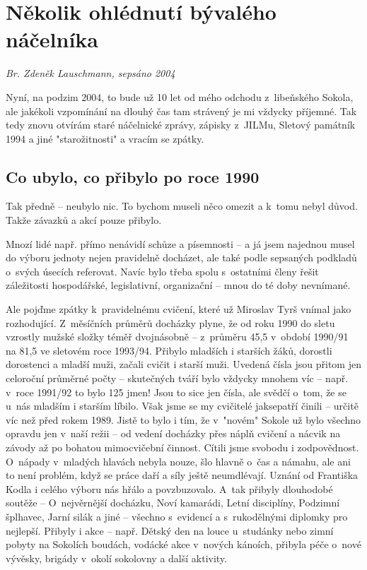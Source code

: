 \documentclass[a5paper, 11pt, twoside]{article}
\begin{document}
\section{Několik ohlédnutí bývalého
náčelníka}

\textit{Br. Zdeněk Lauschmann, sepsáno 2004}

Nyní, na podzim 2004, to bude už 10 let od mého odchodu z~libeňského
Sokola, ale jakékoli vzpomínání na dlouhý čas tam strávený je mi vždycky
příjemné. Tak tedy znovu otvírám staré náčelnické zprávy, zápisky
z~JILMu, Sletový památník 1994 a jiné "starožitnosti" a vracím se zpátky.

\subsection{Co ubylo, co přibylo po roce
1990}

Tak předně -- neubylo nic. To bychom museli něco omezit a k~tomu nebyl
důvod. Takže závazků a akcí pouze přibylo.

Mnozí lidé např. přímo nenávidí schůze a písemnosti -- a já jsem
najednou musel do výboru jednoty nejen pravidelně docházet, ale také
podle sepsaných podkladů o~svých úsecích referovat. Navíc bylo třeba
spolu s~ostatními členy řešit záležitosti hospodářské, legislativní,
organizační -- mnou do té doby nevnímané.

Ale pojďme zpátky k~pravidelnému cvičení, které už Miroslav Tyrš vnímal
jako rozhodující. Z~měsíčních průměrů docházky plyne, že od roku 1990 do
sletu vzrostly mužské složky téměř dvojnásobně -- z~průměru 45,5
v~období 1990/91 na 81,5 ve sletovém roce 1993/94. Přibylo mladších i
starších žáků, dorostli dorostenci a mladší muži, začali cvičit i starší
muži. Uvedená čísla jsou přitom jen celoroční průměrné počty --
skutečných tváří bylo vždycky mnohem víc -- např. v~roce 1991/92 to bylo
125 jmen! Jsou to sice jen čísla, ale svědčí o~tom, že se u~nás mladším
i starším líbilo. Však jsme se my cvičitelé jaksepatří činili -- určitě
víc než před rokem 1989. Jistě to bylo i tím, že v~"novém" Sokole už
bylo všechno opravdu jen v~naší režii -- od vedení docházky přes náplň
cvičení a nácvik na závody až po bohatou mimocvičební činnost. Cítili
jsme svobodu i zodpovědnost. O~nápady v~mladých hlavách nebyla nouze,
šlo hlavně o~čas a námahu, ale ani to není problém, když se práce daří a
síly ještě neumdlévají. Uznání od Františka Kodla i celého výboru nás
hřálo a povzbuzovalo. A~tak přibyly dlouhodobé soutěže -- O~nejvěrnější
docházku, Noví kamarádi, Letní disciplíny, Podzimní šplhavec, Jarní
silák a jiné -- všechno s~evidencí a s~rukodělnými diplomky pro
nejlepší. Přibyly i akce -- např. Dětský den na louce u~studánky nebo
zimní pobyty na Sokolích boudách, vodácké akce v~nových kánoích, přibyla
péče o~nové vývěsky, brigády v~okolí sokolovny a další aktivity.
\end{document}

